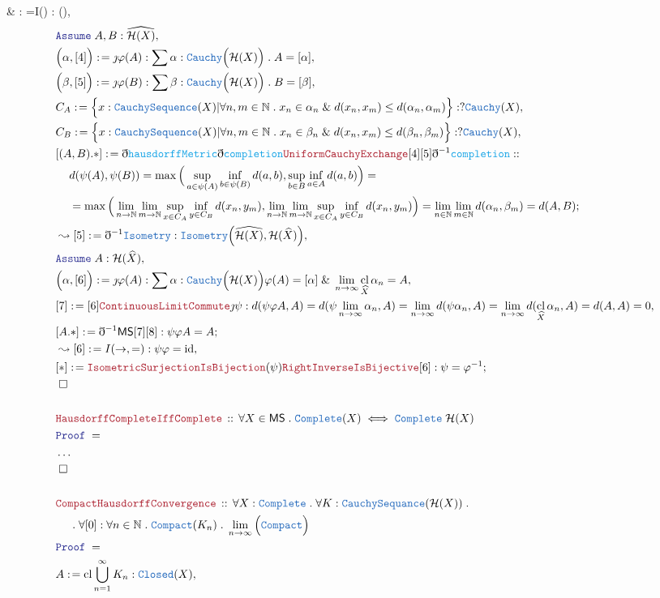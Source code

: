 \documentclass[12pt]{scrartcl}
\newcommand{\TYPE}[1]{\textcolor{NavyBlue}{\mathtt{#1}}}
\newcommand{\FUNC}[1]{\textcolor{Cerulean}{\mathtt{#1}}}
\newcommand{\LOGIC}[1]{\textcolor{Blue}{\mathtt{#1}}}
\newcommand{\THM}[1]{\textcolor{Maroon}{\mathtt{#1}}}
\renewcommand{\.}{\; . \;}
\newcommand{\de}{: \kern 0.1pc =}
\newcommand{\Theorem}[2]{& \THM{#1} \, :: \, #2 \\ & \Proof = \\ }
\newcommand{\NewLine}{\\ & \kern 1pc}
\newcommand{\Page}[1]{ \begin{align*} #1 \end{align*}   }
\newcommand{ \bd }{ \ByDef }
\newcommand{\NoProof}{ & \ldots \\ \EndProof}
\renewcommand{\And}{\; \& \;}
\newcommand{\Nat}{\mathbb{N} }
\DeclareMathOperator*{\id}{id}
\newcommand{\Say}[3]{& #1 \de #2 : #3, \\}
\newcommand{\Conclude}[3]{& #1 \de #2 : #3; \\}
\newcommand{\Derive}[3]{& \leadsto #1 \de #2 : #3, \\}
\newcommand{\Assume}[2]{& \LOGIC{Assume} \; #1 : #2, \\}
\newcommand{\QED}{\; \square}
\newcommand{\EndProof}{& \QED \\}
\newcommand{\ByDef}{\eth}
\newcommand{\ByConstr}{\jmath}
\newcommand{\Proof}{\LOGIC{Proof} \; }
\DeclareMathOperator*{\cl}{cl}
\newcommand{\MS}{\mathsf{MS}}
\begin{document}
{ 	\Derive{\psi}{I(\to)}{ \to \mathcal{H}(\widehat{X})}
}\Page{
	\Assume{A,B}{\widehat{\mathcal{H}(X)}}
	\Say{\Big( \alpha, [4] \Big)}{\ByConstr \varphi(A)}{\sum \alpha : \TYPE{Cauchy}\Big( \mathcal{H}( X) \Big) \.  A = [\alpha]  }
 	\Say{\Big( \beta, [5]\Big)}{\ByConstr \varphi(B)}{\sum \beta : \TYPE{Cauchy}\Big( \mathcal{H}( X) \Big) \. B = [\beta] }
 	\Say{C_A}{\Big\{ x : \TYPE{CauchySequence}(X) |  \forall n,m \in \Nat \. x_n \in \alpha_n \And   d(x_n,x_m) \le d(\alpha_n,\alpha_m)   \Big\}}{?\TYPE{Cauchy}(X)}
 	\Say{C_B}{\Big\{ x : \TYPE{CauchySequence}(X) |  \forall n,m \in \Nat \. x_n \in \beta_n \And   d(x_n,x_m) \le d(\beta_n,\beta_m)   \Big\}}{?\TYPE{Cauchy}(X)}
 	\Conclude{[(A,B).*]}{\bd \FUNC{hausdorffMetric}\bd \FUNC{completion} \THM{UniformCauchyExchange}[4][5]\bd^{-1} \FUNC{completion}}
 	{
 		 : \NewLine
 		  d(\psi(A),\psi(B)) =  
 		  \max\Big(  \sup_{a \in \psi(A)} \inf_{b \in \psi(B)} d(a,b), \sup_{b \in B} \inf_{a \in A} d(a,b)   \Big) = \NewLine = 
 		  \max\Big( \lim_{n \to \Nat} \lim_{m \to \Nat} \sup_{x \in C_A} \inf_{y \in C_B} d(x_n,y_m),  \lim_{n \to \Nat} \lim_{m \to \Nat} \sup_{x \in C_A} \inf_{y \in C_B} d(x_n,y_m)  \Big)     =
 		  \lim_{n \in \Nat} \lim_{m \in \Nat}   d(\alpha_n,\beta_m)   = d(A,B)       
 	}
 	\Derive{[5]}{\bd^{-1} \TYPE{Isometry}}{\TYPE{Isometry}\Big(\widehat{\mathcal{H}(X)}, \mathcal{H}(\widehat{X})\Big)}
 	\Assume{A}{\mathcal{H}(\widehat{X})}
 	\Say{\Big( \alpha, [6] \Big)}{\ByConstr \varphi(A)}{\sum \alpha : \TYPE{Cauchy}\Big( \mathcal{H}( X) \Big) \varphi(A) = [\alpha] \And \lim_{n \to \infty} \cl_{\widehat{X}}  \alpha_n = A  }
 	\Say{[7]}{[6] \THM{ContinuousLimitCommute}\ByConstr \psi}
 	{
 		d(\psi\varphi A, A) =  
 		d(\psi \lim_{n \to \infty} \alpha_n, A) =  
 		\lim_{n \to \infty}   d(\psi \alpha_n, A) =  
 		\lim_{n \to \infty}   d(\cl_{\widehat{X}} \alpha_n,A)   =   
 		d(A,A) = 0
 	}
 	\Conclude{[A.*]}{\bd^{-1} \MS [7][8]}{\psi\varphi A = A}
 	\Derive{[6]}{I(\to,=)}{\psi\varphi = \id}
 	\Conclude{[*]}{\THM{IsometricSurjectionIsBijection}(\psi)\THM{RightInverseIsBijective}[6]}{\psi = \varphi^{-1}}
 	\EndProof
 	\\
 	\Theorem{HausdorffCompleteIffComplete}{\forall X \in \MS \. \TYPE{Complete}(X) \iff  \TYPE{Complete}\;\mathcal{H}(X)}
 	\NoProof
 	\\
 	\Theorem{CompactHausdorffConvergence}{\forall X : \TYPE{Complete} \. \forall K : \TYPE{CauchySequance}(\mathcal{H}(X)) \. \NewLine \. \forall [0] : \forall n \in \Nat \.  \TYPE{Compact}(K_n) \. \lim_{n \to \infty} \Big(\TYPE{Compact}\Big) }
 	\Say{A}{\cl \bigcup^\infty_{n=1} K_n}{\TYPE{Closed}(X)}
}
\end{document}
